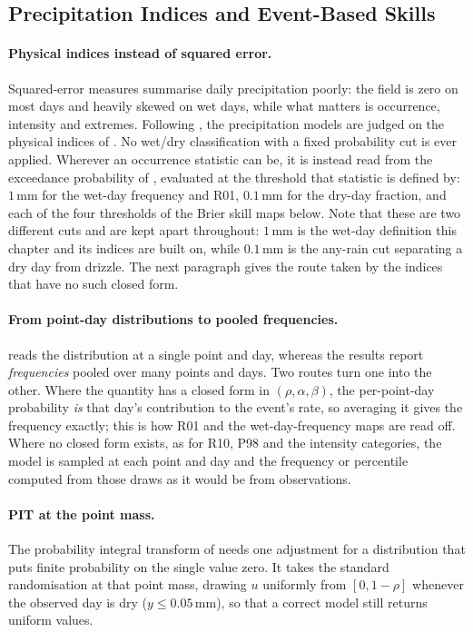 \subsection{Precipitation Indices and Event-Based Skills}\label{subsec:app-skill-precip}

\paragraph*{Physical indices instead of squared error.}
Squared-error measures summarise daily precipitation poorly: the field is zero on most days and heavily skewed on wet days, while what matters is occurrence, intensity and extremes. Following \textcite{vaughan2022convcnp}, the precipitation models are judged on the physical indices of . No wet/dry classification with a fixed probability cut is ever applied. Wherever an occurrence statistic can be, it is instead read from the exceedance probability of , evaluated at the threshold that statistic is defined by: $1\,\mathrm{mm}$ for the wet-day frequency and R01, $0.1\,\mathrm{mm}$ for the dry-day fraction, and each of the four thresholds of the Brier skill maps below. Note that these are two different cuts and are kept apart throughout: $1\,\mathrm{mm}$ is the wet-day definition this chapter and its indices are built on, while $0.1\,\mathrm{mm}$ is the any-rain cut separating a dry day from drizzle. The next paragraph gives the route taken by the indices that have no such closed form.

\paragraph*{From point-day distributions to pooled frequencies.}
 reads the distribution at a single point and day, whereas the results report \emph{frequencies} pooled over many points and days. Two routes turn one into the other. Where the quantity has a closed form in $(\rho, \alpha, \beta)$, the per-point-day probability \emph{is} that day's contribution to the event's rate, so averaging it gives the frequency exactly; this is how R01 and the wet-day-frequency maps are read off. Where no closed form exists, as for R10, P98 and the intensity categories, the model is sampled at each point and day and the frequency or percentile computed from those draws as it would be from observations.

\paragraph*{PIT at the point mass.}
The probability integral transform of  needs one adjustment for a distribution that puts finite probability on the single value zero. It takes the standard randomisation at that point mass, drawing $u$ uniformly from $[0, 1-\rho]$ whenever the observed day is dry ($y \leq 0.05\,\mathrm{mm}$), so that a correct model still returns uniform values.

